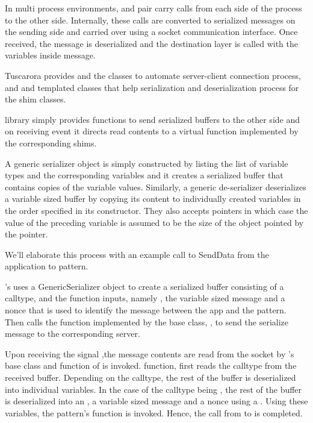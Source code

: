In multi process environments,  and   pair carry calls from each side of the process to the other side. Internally, these calls are converted to serialized messages on the sending side and carried over using a socket communication interface. Once received, the message is deserialized and the destination layer is called with the variables inside message. 

Tuscarora provides  and the  classes to automate server-client connection process, and  and  templated classes that help serialization and deserialization process for the shim classes. 


 library simply provides functions to send serialized buffers to the other side and on receiving event it directs read contents to a virtual  function implemented by the corresponding shims. 

A generic serializer object is simply constructed by listing the list of variable types and the corresponding variables and it creates a serialized buffer that contains copies of the variable values. Similarly, a generic de-serializer deserializes a variable sized buffer by copying its content to individually created variables in the order specified in its constructor. They also accepts pointers in which case the value of the preceding variable is assumed to be the size of the object pointed by the pointer. 


We'll elaborate this process with an example call to SendData from the  application to  pattern. 

's  uses a GenericSerializer object to create a serialized buffer consisting of a calltype, and the function inputs, namely , the variable sized message and a nonce that is used to identify the message between the app and the pattern. Then  calls the  function implemented by the base class, , to send the serialize message to the corresponding server.

Upon receiving the signal ,the message contents are read from the socket by 's base class  and  function of  is invoked.  function, first reads the calltype from the received buffer. Depending on the calltype, the rest of the buffer is deserialized into individual variables. In the case of the calltype being , the rest of the buffer is deserialized into an , a variable sized message and a nonce using a . Using these variables, the   pattern's  function is invoked. Hence, the call from  to  is completed. 


